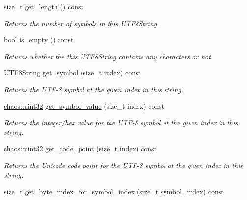 \begin{DoxyCompactItemize}
size\+\_\+t \hyperlink{classchaos_1_1str_1_1_u_t_f8_string_ac0c724e649182e02462b48b94d1f5bf7}{get\+\_\+length} () const 
\begin{DoxyCompactList}\small\item\em Returns the number of symbols in this \hyperlink{classchaos_1_1str_1_1_u_t_f8_string}{U\+T\+F8\+String}. \end{DoxyCompactList}\item 
bool \hyperlink{classchaos_1_1str_1_1_u_t_f8_string_a4fc296e90fbbc45a1e3f142dcd1e9853}{is\+\_\+empty} () const 
\begin{DoxyCompactList}\small\item\em Returns whether the this \hyperlink{classchaos_1_1str_1_1_u_t_f8_string}{U\+T\+F8\+String} contains any characters or not. \end{DoxyCompactList}\item 
\hyperlink{classchaos_1_1str_1_1_u_t_f8_string}{U\+T\+F8\+String} \hyperlink{classchaos_1_1str_1_1_u_t_f8_string_a04dbe9f15dc1b09c858e2450de26d40a}{get\+\_\+symbol} (size\+\_\+t index) const 
\begin{DoxyCompactList}\small\item\em Returns the U\+T\+F-\/8 symbol at the given index in this string. \end{DoxyCompactList}\item 
\hyperlink{namespacechaos_a3b3a47ba1e284655bf1a30c441121c60}{chaos\+::uint32} \hyperlink{classchaos_1_1str_1_1_u_t_f8_string_a1248ee0dde0ff8e028d162cefd67f034}{get\+\_\+symbol\+\_\+value} (size\+\_\+t index) const 
\begin{DoxyCompactList}\small\item\em Returns the integer/hex value for the U\+T\+F-\/8 symbol at the given index in this string. \end{DoxyCompactList}\item 
\hyperlink{namespacechaos_a3b3a47ba1e284655bf1a30c441121c60}{chaos\+::uint32} \hyperlink{classchaos_1_1str_1_1_u_t_f8_string_a007889a60f57ec9196dcebb39abeafdf}{get\+\_\+code\+\_\+point} (size\+\_\+t index) const 
\begin{DoxyCompactList}\small\item\em Returns the Unicode code point for the U\+T\+F-\/8 symbol at the given index in this string. \end{DoxyCompactList}\item 
size\+\_\+t \hyperlink{classchaos_1_1str_1_1_u_t_f8_string_a4dddd9c6133754f5f424033ab28dc0e5}{get\+\_\+byte\+\_\+index\+\_\+for\+\_\+symbol\+\_\+index} (size\+\_\+t symbol\+\_\+index) const 

\end{DoxyCompactItemize}
